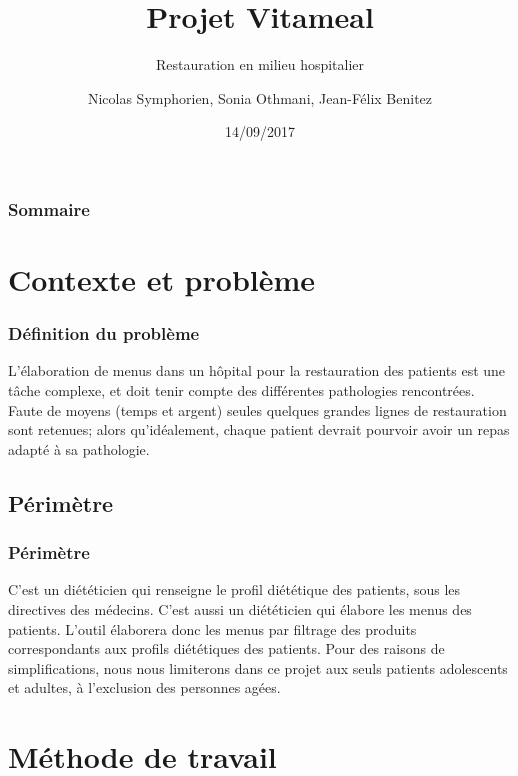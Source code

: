 \documentclass{beamer}
\title{Projet Vitameal}
\subtitle{Restauration en milieu hospitalier}
\author{Nicolas Symphorien, Sonia Othmani, Jean-Félix Benitez} %
\institute{CNAM}
\date{14/09/2017}
\begin{document}
\begin{frame}[plain]
  \titlepage
\end{frame}

\begin{frame}
  \frametitle{Sommaire}
  \tableofcontents
\end{frame}

\section{Contexte et problème}
\begin{frame}[label=definitionDuProbleme]
\frametitle{Définition du problème}
L'élaboration de menus dans un hôpital pour la restauration des patients
est une tâche complexe, et doit tenir compte des différentes pathologies
rencontrées. Faute de moyens (temps et argent) seules quelques grandes
lignes de restauration sont retenues; alors qu'idéalement, chaque
patient devrait pourvoir avoir un repas adapté à sa pathologie.
\end{frame}


\subsection{Périmètre}
\begin{frame}[label=perimetre]
\frametitle{Périmètre}
C'est un diététicien qui renseigne le profil diététique des patients,
sous les directives des médecins. C'est aussi un diététicien qui élabore
les menus des patients. L'outil élaborera donc
les menus par filtrage des produits correspondants aux profils
diététiques des patients. Pour des raisons de simplifications, nous nous limiterons dans ce projet aux seuls patients adolescents et adultes, à l'exclusion des personnes agées.
\end{frame}

\section{Méthode de travail}
\end{document}
